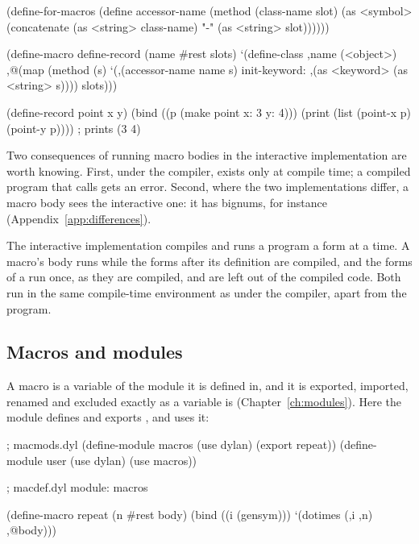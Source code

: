 \begin{dylan}
(define-for-macros
  (define accessor-name
    (method (class-name slot)
      (as <symbol>
          (concatenate (as <string> class-name) "-" (as <string> slot))))))

(define-macro define-record (name #rest slots)
  `(define-class ,name (<object>)
     ,@(map (method (s)
              `(,(accessor-name name s)
                init-keyword: ,(as <keyword> (as <string> s))))
            slots)))

(define-record point x y)
(bind ((p (make point x: 3 y: 4)))
  (print (list (point-x p) (point-y p))))   ; prints (3 4)
\end{dylan}

Two consequences of running macro bodies in the interactive
implementation are worth knowing. First, under the compiler,
 exists only at compile time; a compiled program that
calls  gets an error. Second,
where the two implementations differ, a macro body sees the interactive
one: it has bignums, for instance (Appendix~\ref{app:differences}).

The interactive implementation compiles and runs a program a form at a
time. A macro's body runs while the forms after its definition are
compiled, and the forms of a  run once, as they
are compiled, and are left out of the compiled code. Both run in the
same compile-time environment as under the compiler, apart from the
program.

\subsection{Macros and modules}\label{sec:ext-macro-modules}

A macro is a variable of the module it is defined in, and it is
exported, imported, renamed and excluded exactly as a variable is
(Chapter~\ref{ch:modules}). Here the module  defines and
exports , and  uses it:

\begin{dylan}
; macmods.dyl
(define-module macros (use dylan) (export repeat))
(define-module user (use dylan) (use macros))
\end{dylan}

\begin{dylan}
; macdef.dyl
module: macros

(define-macro repeat (n #rest body)
  (bind ((i (gensym)))
    `(dotimes (,i ,n) ,@body)))
\end{dylan}

